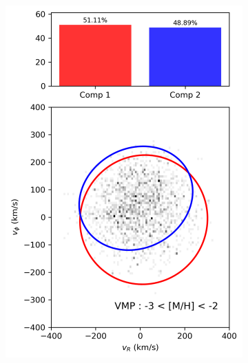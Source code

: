 \documentclass[a4paper,10pt]{article}
\begin{document}
\begin{multicols}{2}
\begin{figure}[t]
  \begin{subfigure}[t]{0.245\textwidth}
    \centering\includegraphics[width=\linewidth]{../figures/gmm_VMP.png}
  \end{subfigure}\hfill
  \begin{subfigure}[t]{0.245\textwidth}

\end{subfigure}
\end{figure}
\end{multicols}
\end{document}
